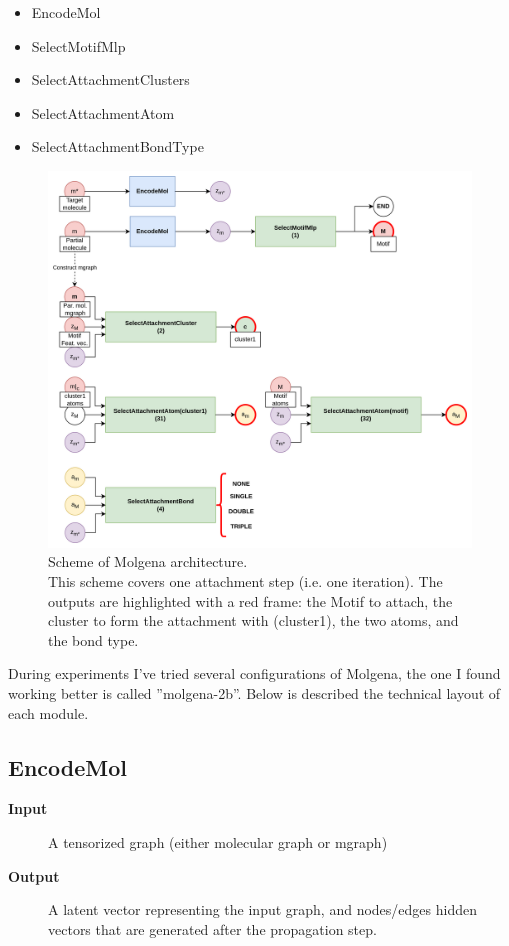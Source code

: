 \documentclass{article}
\begin{document}
\begin{itemize}
\item EncodeMol
\item SelectMotifMlp
\item SelectAttachmentClusters
\item SelectAttachmentAtom
\item SelectAttachmentBondType
\end{itemize}

\begin{figure}[h]
\includegraphics[width=1.5\textwidth]{./img/arch.png}
\caption{
Scheme of Molgena architecture.\\
This scheme covers one attachment step (i.e. one iteration).
The outputs are highlighted with a red frame: the Motif to attach, the cluster to form the attachment with (cluster1), the two atoms, and the bond type.
}
\end{figure}

During experiments I've tried several configurations of Molgena, the one I found working better is called ''molgena-2b''.
Below is described the technical layout of each module.

\subsection{EncodeMol}

\begin{description}
\item[\textbf{Input}]
    A tensorized graph (either molecular graph or mgraph)
\item[\textbf{Output}]
    A latent vector representing the input graph,
    and nodes/edges hidden vectors that are generated after the propagation step.
\end{description}
\end{document}
